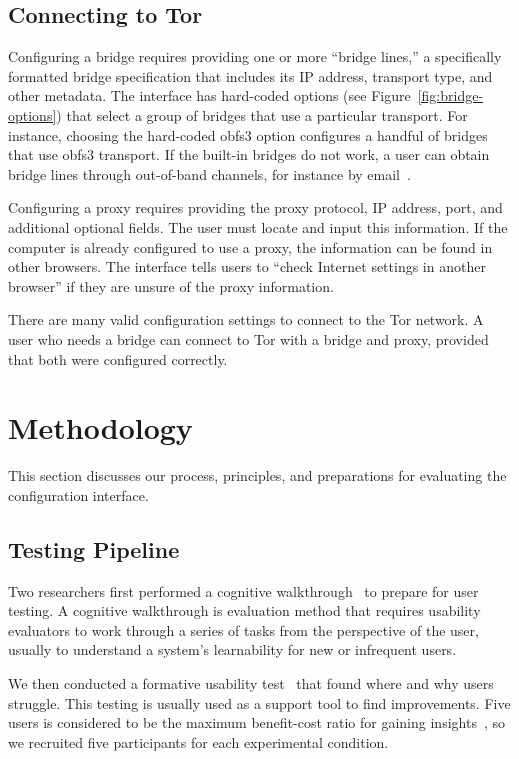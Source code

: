 \documentclass[USenglish,oneside,twocolumn]{article}
\begin{document}
\subsection{Connecting to Tor} 
Configuring a bridge requires providing one or more
``bridge lines,'' a specifically formatted bridge specification that
includes its IP address, transport type, and other metadata.
The interface has hard-coded options (see Figure~\ref{fig:bridge-options}) 
that select a group of bridges that use a particular transport.
For instance, choosing the hard-coded obfs3 option
configures a handful of bridges that use obfs3 transport.
If the built-in bridges do not work, a user can obtain bridge lines
through out-of-band channels, for instance by email~\cite{bridgedb}.

Configuring a proxy requires providing the proxy protocol, IP address, port, and additional optional fields. The user must locate and input this information. If the computer is already configured to use a proxy, the information can be found in other browsers. The interface tells users to ``check Internet settings in another browser'' if they are unsure of the proxy information. 

There are many valid configuration settings to connect to the Tor network.
A user who needs a bridge can connect to Tor with a bridge and proxy, provided that both were configured correctly.

\section{Methodology} 
This section discusses our process, principles, and preparations for evaluating the configuration interface.

\subsection{Testing Pipeline} 
Two researchers first performed a cognitive walkthrough~\cite{cognitive-walkthrough} to prepare for user testing. A cognitive walkthrough is evaluation method that requires usability evaluators to work through a series of tasks from the perspective of the user, usually to understand a system's learnability for new or infrequent users.

We then conducted a formative usability test~\cite{formative} that found where and why users struggle. This testing is usually used as a support tool to find improvements. Five users is considered to be the maximum benefit-cost ratio for gaining insights~\cite{howmanyusers}, so we recruited five participants for each experimental condition. 
\end{document}
